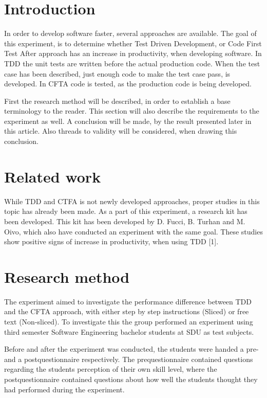\documentclass{sig-alternate-05-2015}
\begin{document}
\section{Introduction}
In order to develop software faster, several approaches are available. The goal of this experiment, is to determine whether Test Driven Development, or Code First Test After approach has an increase in productivity, when developing software. In TDD the unit tests are written before the actual production code. When the test case has been described, just enough code to make the test case pass, is developed.
In CFTA code is tested, as the production code is being developed.

First the research method will be described, in order to establish a base terminology to the reader. This section will also describe the requirements to the experiment as well.
A conclusion will be made, by the result presented later in this article. Also threads to validity will be considered, when drawing this conclusion.

\section{Related work}
While TDD and CTFA is not newly developed approaches, proper studies in this topic has already been made. As a part of this experiment, a research kit has been developed. This kit has been developed by D. Fucci, B. Turhan and M. Oivo, which also have conducted an experiment with the same goal. These studies show positive signs of increase in productivity, when using TDD [1].

\section{Research method}
The experiment aimed to investigate the performance difference between TDD and the CFTA approach, with either step by step instructions (Sliced) or free text (Non-sliced). To investigate this the group performed an experiment using third semester Software Engineering bachelor students at SDU as test subjects.

Before and after the experiment was conducted, the students were handed a pre- and a postquestionnaire respectively.
The prequestionnaire contained questions regarding the students perception of their own skill level, where the postquestionnaire contained questions about how well the students thought they had performed during the experiment.
\end{document}
